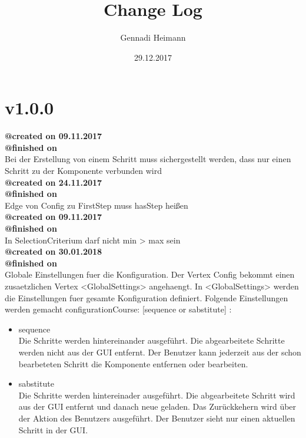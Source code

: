 \documentclass{article}
\begin{document}
\begin{titlepage}
\author{Gennadi Heimann} 
\title{Change Log} 
\date{29.12.2017} 
\maketitle
\end{titlepage}

\section{v1.0.0}

\noindent \textbf{@created on 09.11.2017}\\
\textbf{@finished on}\\

\noindent Bei der Erstellung von einem Schritt muss sichergestellt werden, dass nur einen 
Schritt zu der Komponente verbunden wird\\

\noindent \textbf{@created on 24.11.2017}\\
\textbf{@finished on }\\

\noindent Edge von Config zu FirstStep muss hasStep heißen\\

\noindent \textbf{@created on 09.11.2017}\\
\textbf{@finished on}\\

\noindent In SelectionCriterium darf nicht min > max sein\\

\noindent \textbf{@created on 30.01.2018}\\
\textbf{@finished on }\\

\noindent Globale Einstellungen fuer die Konfiguration.
Der Vertex Config bekommt einen zusaetzlichen Vertex <GlobalSettings> angehaengt.
In <GlobalSettings> werden die Einstellungen fuer gesamte Konfiguration definiert.
Folgende Einstellungen werden gemacht configurationCourse: [sequence or sabstitute] :
\begin{itemize}
	\item sequence\\ 
	Die Schritte werden hintereinander ausgeführt. Die abgearbeitete Schritte 
	werden nicht aus der GUI entfernt. Der Benutzer kann jederzeit aus der schon bearbeteten
	Schritt die Komponente entfernen oder bearbeiten.\\
   \item sabstitute\\ 
   Die Schritte werden hintereinader ausgeführt. Die abgearbeitete Schritt 
	wird aus der GUI entfernt und danach neue geladen. Das Zurückkehern wird über der Aktion
   des Benutzers ausgeführt. Der Benutzer sieht nur einen aktuellen Schritt in der GUI.\\
\end{itemize}
\end{document}
